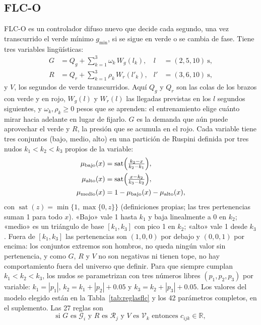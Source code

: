 \documentclass[journal]{IEEEtran}
\newcommand{\FLC}{FLC-O}
\begin{document}
\subsection{FLC-O}
\label{sec:flc}
\FLC{} es un controlador difuso nuevo que decide cada segundo, una vez transcurrido el verde mínimo $g_{\min}$, si se sigue en verde o se cambia de fase. Tiene tres variables lingüísticas:
\begin{align}
G&=Q_g+\textstyle\sum_{k=1}^{3}\omega_k\,W_g(l_k), & l&=(2,5,10)\ \text{s},\nonumber\\
R&=Q_r+\textstyle\sum_{k=1}^{3}\rho_k\,W_r(l'_k), & l'&=(3,6,10)\ \text{s},\label{eq:GR}
\end{align}
y $V$, los segundos de verde transcurridos. Aquí $Q_g$ y $Q_r$ son las colas de los brazos con verde y en rojo, $W_g(l)$ y $W_r(l)$ las llegadas previstas en los $l$ segundos siguientes, y $\omega_k,\rho_k\ge0$ pesos que se aprenden: el entrenamiento elige cuánto mirar hacia adelante en lugar de fijarlo. $G$ es la demanda que aún puede aprovechar el verde y $R$, la presión que se acumula en el rojo. Cada variable tiene tres conjuntos (bajo, medio, alto) en una partición de Ruspini \cite{Ruspini1969} definida por tres nudos $k_1<k_2<k_3$ propios de la variable:
\begin{align}
\mu_{\text{bajo}}(x)&=\operatorname{sat}\Bigl(\tfrac{k_2-x}{k_2-k_1}\Bigr),\nonumber\\
\mu_{\text{alto}}(x)&=\operatorname{sat}\Bigl(\tfrac{x-k_2}{k_3-k_2}\Bigr),\label{eq:mf}\\
\mu_{\text{medio}}(x)&=1-\mu_{\text{bajo}}(x)-\mu_{\text{alto}}(x),\nonumber
\end{align}
con $\operatorname{sat}(z)=\min\{1,\max\{0,z\}\}$ (definiciones propias; las tres pertenencias suman 1 para todo $x$). «Bajo» vale 1 hasta $k_1$ y baja linealmente a 0 en $k_2$; «medio» es un triángulo de base $[k_1,k_3]$ con pico 1 en $k_2$; «alto» vale 1 desde $k_3$. Fuera de $[k_1,k_3]$ las pertenencias son $(1,0,0)$ por debajo y $(0,0,1)$ por encima: los conjuntos extremos son hombros, no queda ningún valor sin pertenencia, y como $G$, $R$ y $V$ no son negativas ni tienen tope, no hay comportamiento fuera del universo que definir. Para que siempre cumplan $k_1<k_2<k_3$, los nudos se parametrizan con tres números libres $(p_1,p_2,p_3)$ por variable: $k_1=|p_1|$, $k_2=k_1+|p_2|+0.05$ y $k_3=k_2+|p_3|+0.05$. Los valores del modelo elegido están en la Tabla~\ref{tab:reglasflc} y los 42 parámetros completos, en el suplemento. Las 27 reglas son
\begin{equation}
\text{si } G \text{ es } \mathcal{G}_i \text{ y } R \text{ es } \mathcal{R}_j \text{ y } V \text{ es } \mathcal{V}_k \text{ entonces } c_{ijk}\in\mathbb{R},
\label{eq:reglaflc}
\end{equation}
\end{document}
